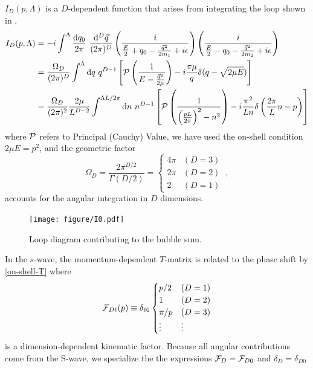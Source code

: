 $I_D(p,\Lambda)$ is a $D$-dependent function that arises from integrating the loop shown in ,
\begin{align}
    I_D(p, \Lambda)
    &=-i\int^{\Lambda}
        \frac { \mathrm {d}q_0}{2\pi}\ \frac{\mathrm { d } ^ { D } \vec{ q } } { (2\pi)^ { D } }
        \left( \frac { i } { \frac{E}{2} + q _ { 0 } - \frac{\vec{q}^2}{2m_1} + i \epsilon } \right)
        \left( \frac { i } { \frac{E}{2} - q _ { 0 } - \frac{\vec{q}^2}{2m_2} + i \epsilon } \right)
    \label{eq:I0 in two particle language}\\
    &=\frac{\Omega_D}{(2\pi)^D}\int^{\Lambda}  \mathrm { d } q \ q^{D-1}\left[\PV \left( \frac { 1 } { E - \frac{\vec{q}^2}{2\mu} } \right)
-i\frac{\pi \mu}{q}\delta(q-\sqrt{2 \mu E})\right]
    \label{eq:I0 in relative coordinates}
    \\
    &=\frac{\Omega_D}{(2\pi)^2}\frac{2\mu}{L^{D-2}}\int^{\Lambda L/2\pi}  \mathrm { d } n \ n^{D-1}\left[\PV \left( \frac { 1 } { \left(\frac{pL}{2\pi}\right)^2 - n^2 } \right)
-i\frac{\pi^2}{L n}\delta\left(\frac{2\pi}{L}n -p\right)\right]
    \label{eq:I0}
\end{align}
where $\mathcal{P}$ refers to Principal (Cauchy) Value, we have used the on-shell condition $2\mu E=p^2$, and the geometric factor
\begin{equation}
\Omega_D=\frac{2\pi^{D/2}}{\Gamma(D/2)}=
    \begin{cases}
        4\pi    &   (D=3)\\
        2\pi    &   (D=2)\\
        2       &   (D=1)
    \end{cases}\ ,
\end{equation}
accounts for the angular integration in $D$ dimensions.

\begin{figure}[h!]
    \center
    \texttt{[image: figure/I0.pdf]}
    \caption{
        Loop diagram contributing to the bubble sum.
    }
    \label{fig:I0}
\end{figure}

In the $s$-wave, the momentum-dependent $T$-matrix is related to the phase shift by \eqref{on-shell-T} where
\begin{equation}\label{eq:spherical FD}
    \mathcal{F}_{D\ell}(p)
    \equiv
    \delta_{\ell 0}
    \begin{cases}
        p/2     & (D=1)\\
        1       & (D=2)\\
        \pi/p   & (D=3)\\
        \vdots  & \vdots
\end{cases}
\end{equation}
is a dimension-dependent kinematic factor. Because all angular contributions come from the S-wave, we specialize the the expressions $\mathcal{F}_{D} = \mathcal{F}_{D0}$ and $\delta_{D} = \delta_{D0}$

